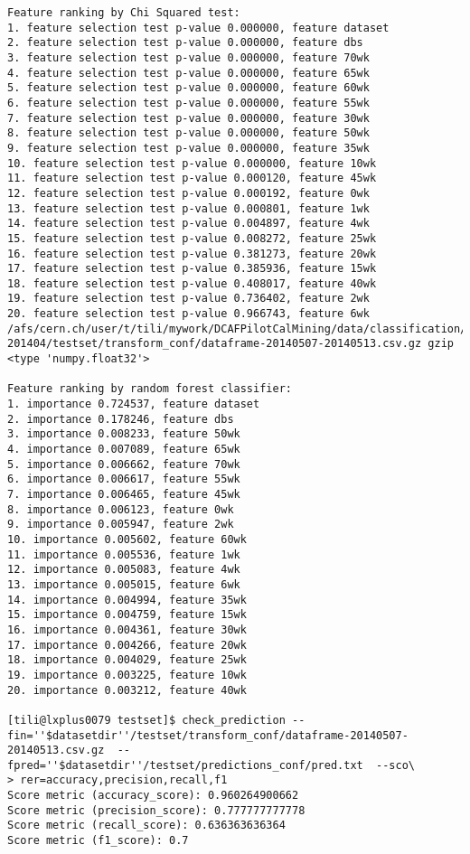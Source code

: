 \begin{verbatim}
Feature ranking by Chi Squared test:
1. feature selection test p-value 0.000000, feature dataset
2. feature selection test p-value 0.000000, feature dbs
3. feature selection test p-value 0.000000, feature 70wk
4. feature selection test p-value 0.000000, feature 65wk
5. feature selection test p-value 0.000000, feature 60wk
6. feature selection test p-value 0.000000, feature 55wk
7. feature selection test p-value 0.000000, feature 30wk
8. feature selection test p-value 0.000000, feature 50wk
9. feature selection test p-value 0.000000, feature 35wk
10. feature selection test p-value 0.000000, feature 10wk
11. feature selection test p-value 0.000120, feature 45wk
12. feature selection test p-value 0.000192, feature 0wk
13. feature selection test p-value 0.000801, feature 1wk
14. feature selection test p-value 0.004897, feature 4wk
15. feature selection test p-value 0.008272, feature 25wk
16. feature selection test p-value 0.381273, feature 20wk
17. feature selection test p-value 0.385936, feature 15wk
18. feature selection test p-value 0.408017, feature 40wk
19. feature selection test p-value 0.736402, feature 2wk
20. feature selection test p-value 0.966743, feature 6wk
/afs/cern.ch/user/t/tili/mywork/DCAFPilotCalMining/data/classification/tier2/merge_conf_tier2_201305-201404/testset/transform_conf/dataframe-20140507-20140513.csv.gz gzip <type 'numpy.float32'>

Feature ranking by random forest classifier:
1. importance 0.724537, feature dataset
2. importance 0.178246, feature dbs
3. importance 0.008233, feature 50wk
4. importance 0.007089, feature 65wk
5. importance 0.006662, feature 70wk
6. importance 0.006617, feature 55wk
7. importance 0.006465, feature 45wk
8. importance 0.006123, feature 0wk
9. importance 0.005947, feature 2wk
10. importance 0.005602, feature 60wk
11. importance 0.005536, feature 1wk
12. importance 0.005083, feature 4wk
13. importance 0.005015, feature 6wk
14. importance 0.004994, feature 35wk
15. importance 0.004759, feature 15wk
16. importance 0.004361, feature 30wk
17. importance 0.004266, feature 20wk
18. importance 0.004029, feature 25wk
19. importance 0.003225, feature 10wk
20. importance 0.003212, feature 40wk

[tili@lxplus0079 testset]$ check_prediction --fin=''$datasetdir''/testset/transform_conf/dataframe-20140507-20140513.csv.gz  --fpred=''$datasetdir''/testset/predictions_conf/pred.txt  --sco\
> rer=accuracy,precision,recall,f1
Score metric (accuracy_score): 0.960264900662
Score metric (precision_score): 0.777777777778
Score metric (recall_score): 0.636363636364
Score metric (f1_score): 0.7
\end{verbatim}
